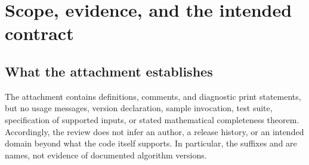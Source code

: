 \documentclass[11pt,letterpaper]{article}
\newcommand{\code}[1]{\texttt{\detokenize{#1}}}
\theoremstyle{definition}
\begin{document}
\begin{abstract}
The supplied Wolfram Language program attempts to denest exact algebraic radical
expressions by combining syntactic normalization with a multiplier search. For each
multiplier it computes a minimal polynomial, intersects that polynomial with a
binomial over an algebraic coefficient field, solves a lower-degree common factor,
and selects a candidate using a zero test. This article reconstructs that process,
proves the mathematical statements that actually justify it, and separates them
from the heuristic decisions that drive the search.

The most serious defect is a change of target: after replacing an original number
$\alpha$ by $\rho=\alpha^q$, the implementation validates candidates against the
principal value $\rho^{1/q}$ instead of against $\alpha$. Exact counterexamples
show how this reverses a sign even when every minimal-polynomial and GCD computation
is correct. Other findings include unrestricted radical factorization, a comparator
that ignores its second argument, a stale-length slice after prime pruning, unchecked
empty solution lists, missing multiplier validation, and an ineffective candidate
cap. The article also identifies sound components, including denominator
rationalization by a minimal polynomial, and gives a conservative candidate kernel,
regression cases, and a prioritized redesign that makes correctness independent of
search quality.
\end{abstract}

{\small\setlength{\parskip}{0pt}\tableofcontents}
\clearpage

\section{Scope, evidence, and the intended contract}
\label{sec:scope}

\subsection{What the attachment establishes}
The attachment contains definitions, comments, and diagnostic print statements, but
no usage messages, version declaration, sample invocation, test suite, specification
of supported inputs, or stated mathematical completeness theorem. Accordingly, the
review does not infer an author, a release history, or an intended domain beyond
what the code itself supports. In particular, the suffixes \code{3} and \code{11}
are names, not evidence of documented algorithm versions.
\end{document}
